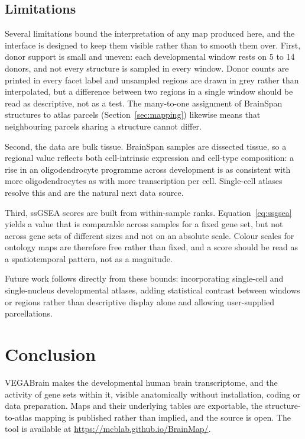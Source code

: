\documentclass[pdflatex,sn-basic]{sn-jnl}
\begin{document}
\subsection{Limitations}\label{sec:limitations}

Several limitations bound the interpretation of any map produced here, and the
interface is designed to keep them visible rather than to smooth them over.
First, donor support is small and uneven: each developmental window rests on 5
to 14 donors, and not every structure is sampled in every window. Donor counts
are printed in every facet label and unsampled regions are drawn in grey rather
than interpolated, but a difference between two regions in a single window
should be read as descriptive, not as a test. The many-to-one assignment of
BrainSpan structures to atlas parcels (Section~\ref{sec:mapping}) likewise means
that neighbouring parcels sharing a structure cannot differ.

Second, the data are bulk tissue. BrainSpan samples are dissected tissue, so a
regional value reflects both cell-intrinsic expression and cell-type
composition: a rise in an oligodendrocyte programme across development is as
consistent with more oligodendrocytes as with more transcription per cell.
Single-cell atlases resolve this and are the natural next data source.

Third, ssGSEA scores are built from within-sample ranks. Equation~\ref{eq:ssgsea}
yields a value that is comparable across samples for a fixed gene set, but not
across gene sets of different sizes and not on an absolute scale. Colour scales
for ontology maps are therefore free rather than fixed, and a score should be
read as a spatiotemporal pattern, not as a magnitude.

Future work follows directly from these bounds: incorporating single-cell and
single-nucleus developmental atlases, adding statistical contrast between
windows or regions rather than descriptive display alone and allowing user-supplied
parcellations.

\section{Conclusion}\label{sec:conclusion}

VEGABrain makes the developmental human brain transcriptome, and the activity of
gene sets within it, visible anatomically without installation, coding or data
preparation. Maps and their underlying tables are exportable, the
structure-to-atlas mapping is published rather than implied, and the source is
open. The tool is available at \url{https://mcblab.github.io/BrainMap/}.
\end{document}
